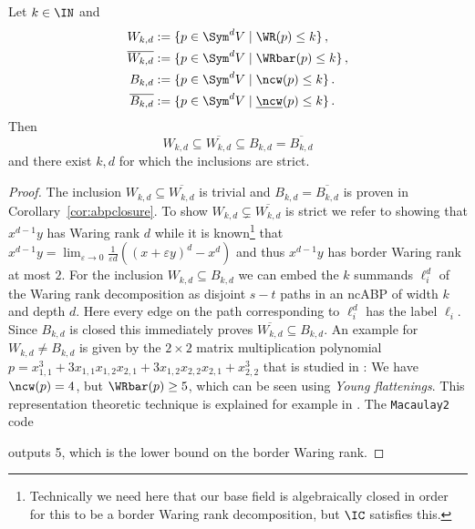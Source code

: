 \begin{corollary}
    Let $k \in \IN$ and
    \begin{align*}
        W_{k,d} &:= \{p \in \Sym^d V \mid \WR(p) \leq k\}\,,\\
        \overline{W_{k,d}} &:= \{p \in \Sym^d V \mid \WRbar(p) \leq k\}\,,\\
        B_{k,d} &:= \{p \in \Sym^d V \mid \ncw(p) \leq k\}\,.\\
        \overline{B_{k,d}} &:= \{p \in \Sym^d V \mid \underline{\ncw}(p) \leq k\}\,.\\
    \end{align*}
    Then
    \[
        W_{k, d} \subseteq \overline{W_{k, d}} \subseteq B_{k,d} = \overline{B_{k,d}}
    \]
and there exist $k,d$ for which the inclusions are strict.
\end{corollary}
\begin{proof}
    The inclusion $W_{k, d} \subseteq \overline{W_{k, d}}$ is trivial and $B_{k,d} = \overline{B_{k,d}}$ is proven in Corollary~\ref{cor:abpclosure}.
    To show $W_{k, d} \subsetneq \overline{W_{k, d}}$ is strict we refer to \cite{carlini2012solution} showing that $x^{d-1}y$ has Waring rank $d$ while it is known\footnote{Technically we need here that our base field is algebraically closed in order for this to be a border Waring rank decomposition, but $\IC$ satisfies this.} that $x^{d-1}y = \lim_{\varepsilon \to 0}\frac{1}{\varepsilon d}((x+\varepsilon y)^{d} - x^{d})$ and thus $x^{d-1}y$ has border Waring rank at most $2$.
    For the inclusion $W_{k, d} \subseteq B_{k,d}$ we can embed the $k$ summands $\ell_i^d$ of the Waring rank decomposition as disjoint $s-t$ paths in an ncABP of width $k$ and depth $d$.
    Here every edge on the path corresponding to $\ell_i^d$ has the label $\ell_i$.
    Since $B_{k,d}$ is closed this immediately proves $\overline{W_{k, d}} \subseteq B_{k,d}$.
    An example for $W_{k, d} \neq B_{k,d}$ is given by the $2 \times 2$ matrix multiplication polynomial $p=x_{1,1}^3 + 3 x_{1,1}x_{1,2}x_{2,1} + 3 x_{1,2}x_{2,2}x_{2,1} + x_{2,2}^3$ that is studied in \cite{CHILO:18}: We have $\ncw(p)=4$, but $\WRbar(p)\geq 5$, which can be seen using \emph{Young flattenings}. This representation theoretic technique is explained for example in \cite{Far:16}. The \texttt{Macaulay2} code

\smallskip


\smallskip

\noindent outputs 5, which is the lower bound on the border Waring rank.
\end{proof}

